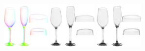     \includegraphics[width=0.180\textwidth]{images/compare/5_combine_r_flow.jpg}
    \includegraphics[width=0.180\textwidth]{images/compare/5_combine_rho.jpg}
    \includegraphics[width=0.180\textwidth]{images/compare/5_combine_r_rho.jpg}
    \vspace{-0.5em}
    \\


